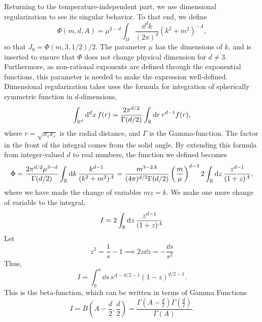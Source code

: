 Returning to the temperature-independent part, we use dimensional regularization to see its singular behavior.
To that end, we define
\begin{equation}
    \Phi(m, d, A) = \mu^{3 - d}\int_{\tilde \Omega} \frac{\dd^d k}{(2 \pi)^d} (k^2 + m^2)^{-A},
\end{equation}
so that $J_0 = \Phi(m, 3, 1/2) / 2$.
The parameter $\mu$ has the dimensions of $k$, and is inserted to ensure that $\Phi$ does not change physical dimension for $d \neq 3$.
Furthermore, as non-rational exponents are defined through the exponential functions, this parameter is needed to make the expression well-defined.
Dimensional regularization takes uses the formula for integration of spherically symmetric function in $d$-dimensions,
\begin{equation}
    \int_{\mathbb{R}^d} \dd^d x \, f(r) 
    = \frac{2 \pi^{d/2}}{\Gamma(d/2)} \int_{\mathbb{R}} \dd r \, r^{d-1}f(r),
\end{equation}
where $r = \sqrt{x_i x_i}$ is the radial distance, and $\Gamma$ is the Gamma-function.
The factor in the front of the integral comes from the solid angle.
By extending this formula from integer-valued $d$ to real numbers, the function we defined becomes
\begin{equation}
    \Phi 
    = \frac{2 \pi^{d/2} \mu^{3 - d} }{\Gamma(d/2)} \int_{\mathbb{R}} \dd k \, 
    \frac{k^{d-1}}{(k^2 + m^2)^A}
    = \frac{m^{3-2A}}{(4 \pi)^{d / 2}\Gamma(d/2)} 
    \left(\frac{m}{\mu}\right)^{d-3} 
    2 \int_{\mathbb{R}} \dd z \, \frac{z^{d - 1}}{(1 + z)^A}, 
\end{equation}
where we have made the change of variables $m z = k$.
We make one more change of variable to the integral,
\begin{equation}
    I = 2 \int_{\mathbb{R}} \dd z \, \frac{z^{d - 1}}{(1 + z)^A}
\end{equation}
Let
\begin{equation}
    z^2 = \frac{1}{s} - 1 \implies 2 z \dd z = - \frac{\dd s}{s^2}
\end{equation}
Thus,
\begin{equation}
    I = \int_0^a \dd s \, s^{A - d/2 - 1} (1 - z)^{d/2 - 1}.
\end{equation}
This is the beta-function, which can be written in terms of Gamma Functions~\cite{Peskin:IntroQFT}
\begin{equation}
    I = B\left(A - \frac{d}{2}, \frac{d}{2}\right) 
    = \frac{\Gamma\left(A - \frac{d}{2}\right) \Gamma\left(\frac{d}{2}\right)}{\Gamma(A)}.
\end{equation}
